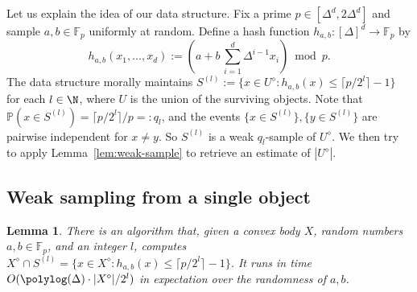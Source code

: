 \documentclass[a4paper, 11pt]{article}
\newtheorem{lemma}[theorem]{Lemma}
\newcommand{\F}{\mathbb{F}}
\renewcommand{\Pr}{\mathbb{P}}
\newcommand{\discrete}[1]{#1^\diamond}
\begin{document}
Let us explain the idea of our data structure. Fix a prime $p \in [\Delta^d, 2 \Delta^d]$ and sample $a,b \in \F_p$ uniformly at random. Define a hash function $h_{a,b}: [\Delta]^d \to \F_p$ by
\[ h_{a,b}(x_1, \dots, x_d) := \left( a + b\,\sum_{i=1}^d \Delta^{i-1} x_i \right) \bmod p. \]
The data structure morally maintains $S^{(l)} := \{x \in \discrete{U} : h_{a,b}(x) \leq \lceil p/2^l \rceil-1\}$ for each $l \in \N$, where $U$ is the union of the surviving objects. Note that $\Pr(x \in S^{(l)}) = \lceil p/2^l\rceil / p =: q_l$, and the events $\{x \in S^{(l)}\}, \{y \in S^{(l)}\}$ are pairwise independent for $x \neq y$. So $S^{(l)}$ is a weak $q_l$-sample of $\discrete{U}$. We then try to apply Lemma~\ref{lem:weak-sample} to retrieve an estimate of $|\discrete{U}|$.

\subsection{Weak sampling from a single object}
\begin{lemma}
    \label{lem:single-weak-sample}
    There is an algorithm  that, given a convex body $X$, random numbers $a,b \in \F_p$, and an integer $l$, computes $\discrete{X} \cap S^{(l)} = \{x \in \discrete{X} : h_{a,b}(x) \leq \lceil p/2^l \rceil - 1\}$. It runs in time $O(\polylog(\Delta) \cdot |\discrete{X}| / 2^l)$ in expectation over the randomness of $a,b$.
\end{lemma}
\end{document}
